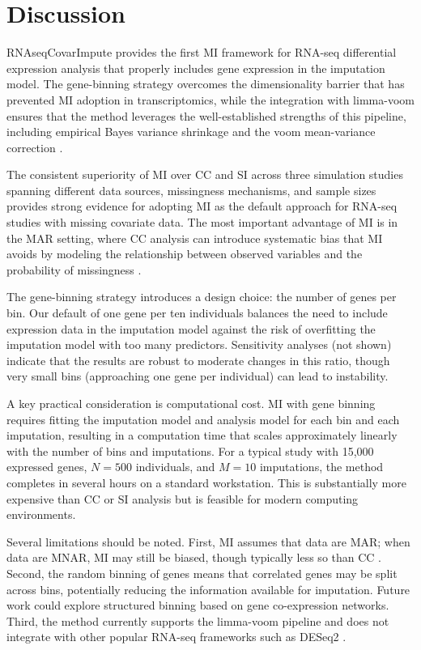 \documentclass[11pt]{article}
\begin{document}
\section{Discussion}

RNAseqCovarImpute provides the first MI framework for RNA-seq differential expression analysis that properly includes gene expression in the imputation model. The gene-binning strategy overcomes the dimensionality barrier that has prevented MI adoption in transcriptomics, while the integration with limma-voom ensures that the method leverages the well-established strengths of this pipeline, including empirical Bayes variance shrinkage and the voom mean-variance correction \citep{law2014,ritchie2015}.

The consistent superiority of MI over CC and SI across three simulation studies spanning different data sources, missingness mechanisms, and sample sizes provides strong evidence for adopting MI as the default approach for RNA-seq studies with missing covariate data. The most important advantage of MI is in the MAR setting, where CC analysis can introduce systematic bias that MI avoids by modeling the relationship between observed variables and the probability of missingness \citep{little2019}.

The gene-binning strategy introduces a design choice: the number of genes per bin. Our default of one gene per ten individuals balances the need to include expression data in the imputation model against the risk of overfitting the imputation model with too many predictors. Sensitivity analyses (not shown) indicate that the results are robust to moderate changes in this ratio, though very small bins (approaching one gene per individual) can lead to instability.

A key practical consideration is computational cost. MI with gene binning requires fitting the imputation model and analysis model for each bin and each imputation, resulting in a computation time that scales approximately linearly with the number of bins and imputations. For a typical study with 15,000 expressed genes, $N = 500$ individuals, and $M = 10$ imputations, the method completes in several hours on a standard workstation. This is substantially more expensive than CC or SI analysis but is feasible for modern computing environments.

Several limitations should be noted. First, MI assumes that data are MAR; when data are MNAR, MI may still be biased, though typically less so than CC \citep{vanbuuren2018}. Second, the random binning of genes means that correlated genes may be split across bins, potentially reducing the information available for imputation. Future work could explore structured binning based on gene co-expression networks. Third, the method currently supports the limma-voom pipeline and does not integrate with other popular RNA-seq frameworks such as DESeq2 \citep{love2014}.
\end{document}
